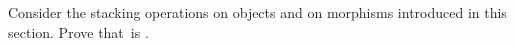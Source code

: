 
\begin{exercise}
    \label{ex:relassocstack}
    Consider the stacking operations on objects and on morphisms introduced in this section.
    Prove that~\RelL is .
\end{exercise}

